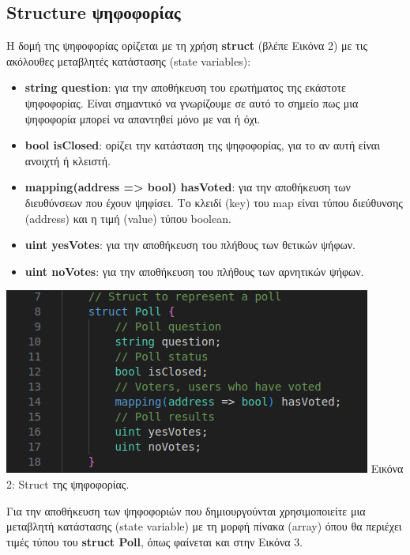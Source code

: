 \documentclass[12pt]{article}
\begin{document}
    \subsection{Structure ψηφοφορίας}
        Η δομή της ψηφοφορίας ορίζεται με τη χρήση \textbf{struct} (βλέπε Εικόνα 2) με τις ακόλουθες μεταβλητές κατάστασης (state variables):
    \begin{itemize}
        \item \textbf{string question}: για την αποθήκευση του ερωτήματος της εκάστοτε ψηφοφορίας. Είναι σημαντικό να γνωρίζουμε σε αυτό το σημείο πως μια ψηφοφορία μπορεί να απαντηθεί μόνο με ναι ή όχι.
        \item \textbf{bool isClosed}: ορίζει την κατάσταση της ψηφοφορίας, για το αν αυτή είναι ανοιχτή ή κλειστή.
        \item \textbf{mapping(address => bool) hasVoted}: για την αποθήκευση των διευθύνσεων που έχουν ψηφίσει. Το κλειδί (key) του map είναι τύπου διεύθυνσης (address) και η τιμή (value) τύπου boolean.
        \item \textbf{uint yesVotes}: για την αποθήκευση του πλήθους των θετικών ψήφων.
        \item \textbf{uint noVotes}: για την αποθήκευση του πλήθους των αρνητικών ψήφων.
    \end{itemize}
    
    \begin{center}
        \includegraphics[width=\linewidth]{images/code_struct_poll.png}
        Εικόνα 2: Struct της ψηφοφορίας.
    \end{center}
    
    \vspace{5mm}
        Για την αποθήκευση των ψηφοφοριών που δημιουργούνται χρησιμοποιείτε μια μεταβλητή κατάστασης (state variable) με τη μορφή πίνακα (array) όπου θα περιέχει τιμές τύπου του \textbf{struct Poll}, όπως φαίνεται και στην Εικόνα 3.
\end{document}
